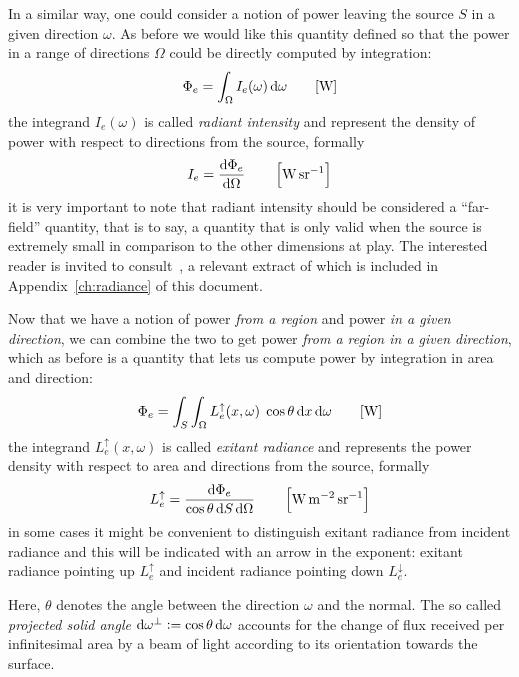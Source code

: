 In a similar way, one could consider a notion of power leaving the source $S$ in
a given
direction $\omega$.
As before we would like this quantity defined so that the power in a range of
directions
$\Omega$ could be directly computed by integration:
\begin{displaymath}
\Phi_e = \int_\Omega I_e(\omega) \mathop{}\!\mathrm{d}\omega \qquad [\si{\watt}]
\end{displaymath}
the integrand $I_e(\omega)$ is called \textsl{radiant intensity} and represent
the density
of power with respect to directions from the source, formally
\begin{displaymath}
I_e = \frac{\d\Phi_e}{\d\Omega} \qquad \left[\si{\watt\per\steradian}\right]
\end{displaymath}
it is very important to note that radiant intensity should be considered a
``far-field'' quantity, that is to say, a quantity that is only valid when
the source is extremely small in comparison to the other dimensions at play.
The interested reader is invited to consult~\cite{nicodemus63}, a relevant
extract of which is included in Appendix~\ref{ch:radiance} of this document.

Now that we have a notion of power \textit{from a region} and power \textit{in
a given direction}, we can combine the two to get power \textit{from a region
in a given direction}, which as before is a quantity that lets us compute
power by integration in area and direction:
\begin{displaymath}
\Phi_e = \int_{S} \int_\Omega L_e^\uparrow(x, \omega) \;\cos\theta\mathop{}\!\mathrm{d} x\mathop{}\!\mathrm{d}\omega
\qquad [\si{\watt}]
\end{displaymath}
the integrand $L_e^\uparrow(x, \omega)$ is called \textsl{exitant radiance}
and represents the power density with respect to area and directions from
the source, formally
\begin{displaymath}
L_e^\uparrow = \frac{\d\Phi_e}{\cos\theta \d S \d\Omega}
\qquad \left[\si{\watt\per\square\meter\per\steradian}\right]
\end{displaymath}
in some cases it might be convenient to distinguish exitant radiance from
incident radiance and this will be indicated with an arrow in the exponent:
exitant radiance pointing up $L_e^\uparrow$ and incident radiance pointing down
$L_e^\downarrow$.

Here, $\theta$ denotes the angle between the direction $\omega$ and the normal.
The so called \emph{projected solid angle} $\mathop{}\!\mathrm{d}\omega^\bot := \cos \theta \mathop{}\!\mathrm{d} \omega$
accounts for the change of flux received per infinitesimal area by a beam of light
according to its orientation towards the surface.



